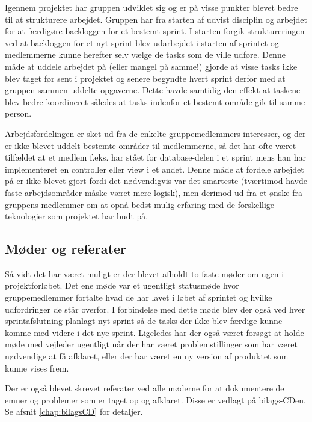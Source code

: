Igennem projektet har gruppen udviklet sig og er på visse punkter blevet bedre til at strukturere arbejdet. Gruppen har fra starten af udvist disciplin og arbejdet for at færdigøre backloggen for et bestemt sprint. I starten forgik struktureringen ved at backloggen for et nyt sprint blev udarbejdet i starten af sprintet og medlemmerne kunne herefter selv vælge de tasks som de ville udføre. Denne måde at uddele arbejdet på (eller mangel på samme!) gjorde at visse tasks ikke blev taget før sent i projektet og senere begyndte hvert sprint derfor med at gruppen sammen uddelte opgaverne. Dette havde samtidig den effekt at taskene blev bedre koordineret således at tasks indenfor et bestemt område gik til samme person. 

Arbejdsfordelingen er sket ud fra de enkelte gruppemedlemmers interesser, og der er ikke blevet uddelt bestemte områder til medlemmerne, så det har ofte været tilfældet at et medlem f.eks. har stået for database-delen i et sprint mens han har implementeret en controller eller view i et andet. Denne måde at fordele arbejdet på er ikke blevet gjort fordi det nødvendigvis var det smarteste (tværtimod havde faste arbejdsområder måske været mere logisk), men derimod ud fra et ønske fra gruppens medlemmer om at opnå bedst mulig erfaring med de forskellige teknologier som projektet har budt på.

\subsection{Møder og referater}
Så vidt det har været muligt er der blevet afholdt to faste møder om ugen i projektforløbet. Det ene møde var et ugentligt statusmøde hvor gruppemedlemmer fortalte hvad de har lavet i løbet af sprintet og hvilke udfordringer de står overfor. I forbindelse med dette møde blev der også ved hver sprintafslutning planlagt nyt sprint så de tasks der ikke blev færdige kunne komme med videre i det nye sprint. Ligeledes har der også været forsøgt at holde møde med vejleder ugentligt når der har været problemstillinger som har været nødvendige at få afklaret, eller der har været en ny version af produktet som kunne vises frem.

Der er også blevet skrevet referater ved alle møderne for at dokumentere de emner og problemer som er taget op og afklaret. Disse er vedlagt på bilags-CDen. Se afsnit \ref{chap:bilagsCD} for detaljer.

